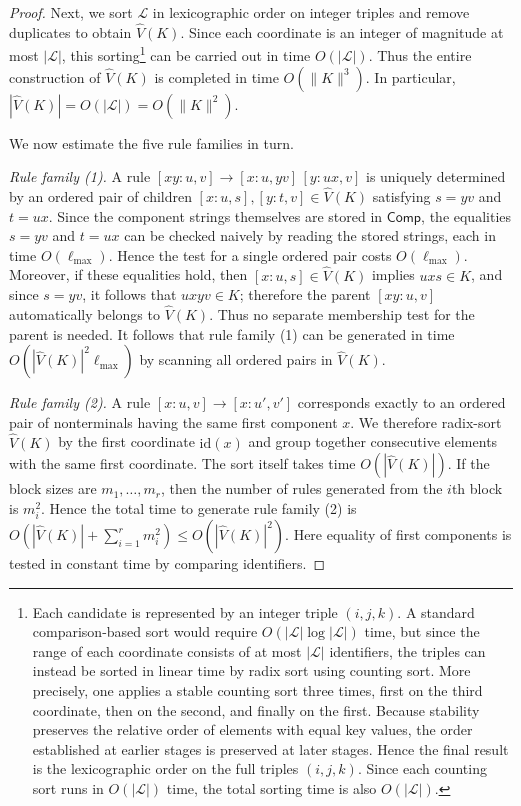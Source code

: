 \documentclass[11pt,a4paper]{article}
\begin{document}
\begin{proof}
Next, we sort $\mathcal L$ in lexicographic order on integer triples and remove duplicates to obtain $\hat V(K)$. Since each coordinate is an integer of magnitude at most $|\mathcal L|$, this sorting\footnote{
Each candidate is represented by an integer triple $(i,j,k)$.
A standard comparison-based sort would require
$O(|\mathcal L|\log |\mathcal L|)$ time,
but since the range of each coordinate consists of at most $|\mathcal L|$ identifiers,
the triples can instead be sorted in linear time by radix sort using counting sort.
More precisely, one applies a stable counting sort three times, first on the third coordinate, then on the second, and finally on the first.
Because stability preserves the relative order of elements with equal key values,
the order established at earlier stages is preserved at later stages.
Hence the final result is the lexicographic order on the full triples $(i,j,k)$.
Since each counting sort runs in $O(|\mathcal L|)$ time,
the total sorting time is also $O(|\mathcal L|)$.
} can be carried out in time $O(|\mathcal L|)$. Thus the entire construction of $\hat V(K)$ is completed in time $O(\|K\|^3)$. In particular, $|\hat V(K)|=O(|\mathcal L|)=O(\|K\|^2)$.

We now estimate the five rule families in turn.

\smallskip\noindent\emph{Rule family \textup{(1)}.}
A rule $[xy:u,v]\to [x:u,yv]\,[y:ux,v]$ is uniquely determined by an ordered pair of children $[x:u,s],[y:t,v]\in\hat V(K)$ satisfying $s=yv$ and $t=ux$. Since the component strings themselves are stored in $\mathsf{Comp}$, the equalities $s=yv$ and $t=ux$ can be checked naively by reading the stored strings, each in time $O(\ell_{\max})$. Hence the test for a single ordered pair costs $O(\ell_{\max})$. Moreover, if these equalities hold, then $[x:u,s]\in\hat V(K)$ implies $uxs\in K$, and since $s=yv$, it follows that $uxyv\in K$; therefore the parent $[xy:u,v]$ automatically belongs to $\hat V(K)$. Thus no separate membership test for the parent is needed. It follows that rule family \textup{(1)} can be generated in time $O(|\hat V(K)|^2\ell_{\max})$ by scanning all ordered pairs in $\hat V(K)$.

\smallskip\noindent\emph{Rule family \textup{(2)}.}
A rule $[x:u,v]\to [x:u',v']$ corresponds exactly to an ordered pair of nonterminals having the same first component $x$. We therefore radix-sort $\hat V(K)$ by the first coordinate $\mathrm{id}(x)$ and group together consecutive elements with the same first coordinate. The sort itself takes time $O(|\hat V(K)|)$. If the block sizes are $m_1,\dots,m_r$, then the number of rules generated from the $i$th block is $m_i^2$. Hence the total time to generate rule family \textup{(2)} is $O(|\hat V(K)|+\sum_{i=1}^r m_i^2)\le O(|\hat V(K)|^2)$. Here equality of first components is tested in constant time by comparing identifiers.


\end{proof}
\end{document}
